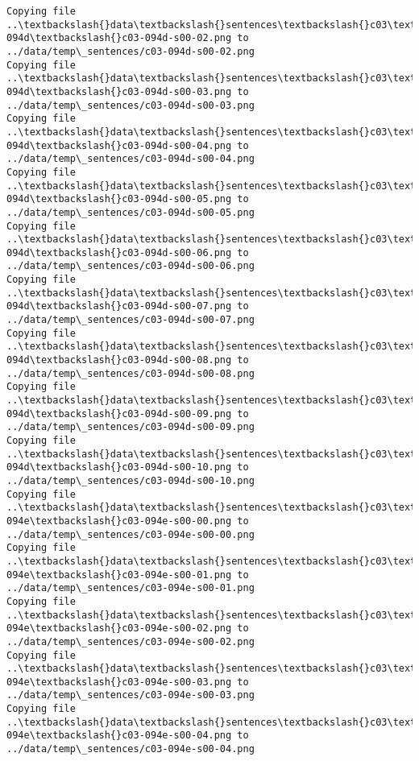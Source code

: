 \documentclass[11pt]{article}
\begin{document}
\begin{Verbatim}[commandchars=\\\{\}]
Copying file ..\textbackslash{}data\textbackslash{}sentences\textbackslash{}c03\textbackslash{}c03-094d\textbackslash{}c03-094d-s00-02.png to
../data/temp\_sentences/c03-094d-s00-02.png
Copying file ..\textbackslash{}data\textbackslash{}sentences\textbackslash{}c03\textbackslash{}c03-094d\textbackslash{}c03-094d-s00-03.png to
../data/temp\_sentences/c03-094d-s00-03.png
Copying file ..\textbackslash{}data\textbackslash{}sentences\textbackslash{}c03\textbackslash{}c03-094d\textbackslash{}c03-094d-s00-04.png to
../data/temp\_sentences/c03-094d-s00-04.png
Copying file ..\textbackslash{}data\textbackslash{}sentences\textbackslash{}c03\textbackslash{}c03-094d\textbackslash{}c03-094d-s00-05.png to
../data/temp\_sentences/c03-094d-s00-05.png
Copying file ..\textbackslash{}data\textbackslash{}sentences\textbackslash{}c03\textbackslash{}c03-094d\textbackslash{}c03-094d-s00-06.png to
../data/temp\_sentences/c03-094d-s00-06.png
Copying file ..\textbackslash{}data\textbackslash{}sentences\textbackslash{}c03\textbackslash{}c03-094d\textbackslash{}c03-094d-s00-07.png to
../data/temp\_sentences/c03-094d-s00-07.png
Copying file ..\textbackslash{}data\textbackslash{}sentences\textbackslash{}c03\textbackslash{}c03-094d\textbackslash{}c03-094d-s00-08.png to
../data/temp\_sentences/c03-094d-s00-08.png
Copying file ..\textbackslash{}data\textbackslash{}sentences\textbackslash{}c03\textbackslash{}c03-094d\textbackslash{}c03-094d-s00-09.png to
../data/temp\_sentences/c03-094d-s00-09.png
Copying file ..\textbackslash{}data\textbackslash{}sentences\textbackslash{}c03\textbackslash{}c03-094d\textbackslash{}c03-094d-s00-10.png to
../data/temp\_sentences/c03-094d-s00-10.png
Copying file ..\textbackslash{}data\textbackslash{}sentences\textbackslash{}c03\textbackslash{}c03-094e\textbackslash{}c03-094e-s00-00.png to
../data/temp\_sentences/c03-094e-s00-00.png
Copying file ..\textbackslash{}data\textbackslash{}sentences\textbackslash{}c03\textbackslash{}c03-094e\textbackslash{}c03-094e-s00-01.png to
../data/temp\_sentences/c03-094e-s00-01.png
Copying file ..\textbackslash{}data\textbackslash{}sentences\textbackslash{}c03\textbackslash{}c03-094e\textbackslash{}c03-094e-s00-02.png to
../data/temp\_sentences/c03-094e-s00-02.png
Copying file ..\textbackslash{}data\textbackslash{}sentences\textbackslash{}c03\textbackslash{}c03-094e\textbackslash{}c03-094e-s00-03.png to
../data/temp\_sentences/c03-094e-s00-03.png
Copying file ..\textbackslash{}data\textbackslash{}sentences\textbackslash{}c03\textbackslash{}c03-094e\textbackslash{}c03-094e-s00-04.png to
../data/temp\_sentences/c03-094e-s00-04.png

\end{Verbatim}
\end{document}
